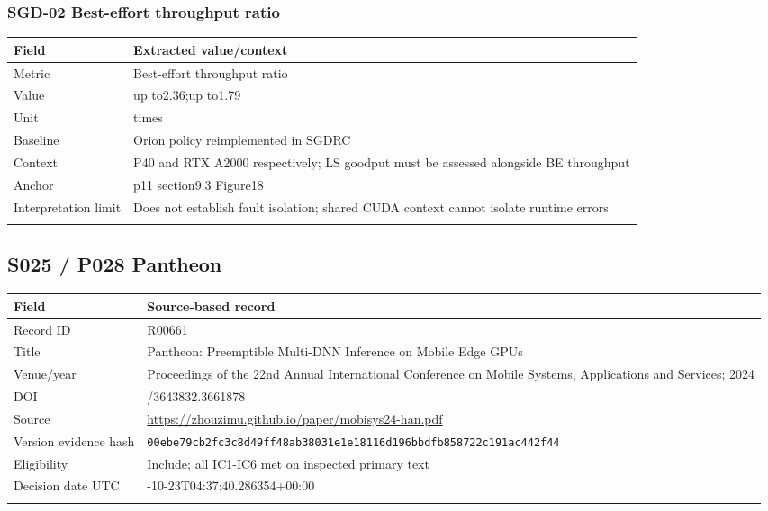 \subsubsection*{SGD-02 Best-effort throughput ratio}
\begin{longtable}{>{\raggedright\arraybackslash}p{}>{\raggedright\arraybackslash}p{}}
\toprule
\textbf{Field} & \textbf{Extracted value/context}\\\midrule\endhead
Metric & Best-effort throughput ratio\\\addlinespace
Value & up to2.36;\allowbreak{}up to1.79\\\addlinespace
Unit & times\\\addlinespace
Baseline & Orion policy reimplemented in SGDRC\\\addlinespace
Context & P40 and RTX A2000 respectively;\allowbreak{} LS goodput must be assessed alongside BE throughput\\\addlinespace
Anchor & p11 section9.3 Figure18\\\addlinespace
Interpretation limit & Does not establish fault isolation;\allowbreak{} shared CUDA context cannot isolate runtime errors\\\addlinespace
\bottomrule\end{longtable}
\clearpage\subsection{S025 / P028 Pantheon}
\cite{s025}
\begin{longtable}{>{\raggedright\arraybackslash}p{}>{\raggedright\arraybackslash}p{}}
\toprule
\textbf{Field} & \textbf{Source-based record}\\\midrule\endhead
Record ID & R00661\\\addlinespace
Title & Pantheon: Preemptible Multi-DNN Inference on Mobile Edge GPUs\\\addlinespace
Venue/year & Proceedings of the 22nd Annual International Conference on Mobile Systems,\allowbreak{} Applications and Services;\allowbreak{} 2024\\\addlinespace
DOI & 10.1145/3643832.3661878\\\addlinespace
Source & \url{https://zhouzimu.github.io/paper/mobisys24-han.pdf}\\\addlinespace
Version evidence hash & \nolinkurl{00ebe79cb2fc3c8d49ff48ab38031e1e18116d196bbdfb858722c191ac442f44}\\\addlinespace
Eligibility & Include;\allowbreak{} all IC1-IC6 met on inspected primary text\\\addlinespace
Decision date UTC & 2026-10-23T04:37:40.286354+00:00\\\addlinespace
\bottomrule\end{longtable}
